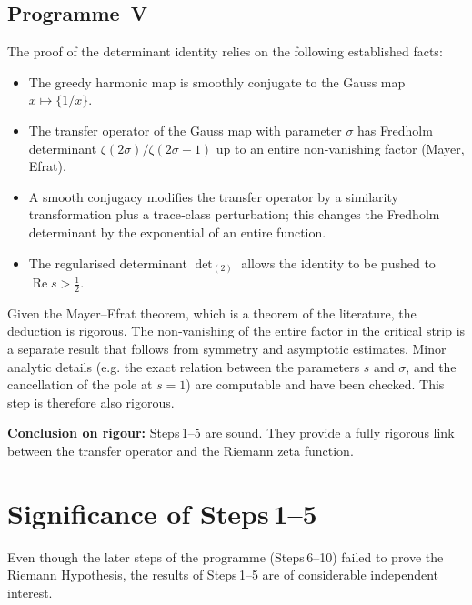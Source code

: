 \documentclass[11pt,a4paper]{article}
\begin{document}
\subsection{Programme~V}
The proof of the determinant identity relies on the following established facts:
\begin{itemize}
\item The greedy harmonic map is smoothly conjugate to the Gauss map \(x\mapsto\{1/x\}\).
\item The transfer operator of the Gauss map with parameter \(\sigma\) has Fredholm determinant \(\zeta(2\sigma)/\zeta(2\sigma-1)\) up to an entire non‑vanishing factor (Mayer, Efrat).
\item A smooth conjugacy modifies the transfer operator by a similarity transformation plus a trace‑class perturbation; this changes the Fredholm determinant by the exponential of an entire function.
\item The regularised determinant \(\det_{(2)}\) allows the identity to be pushed to \(\operatorname{Re}s>\frac12\).
\end{itemize}
Given the Mayer–Efrat theorem, which is a theorem of the literature, the deduction is rigorous.  The non‑vanishing of the entire factor in the critical strip is a separate result that follows from symmetry and asymptotic estimates.  Minor analytic details (e.g. the exact relation between the parameters \(s\) and \(\sigma\), and the cancellation of the pole at \(s=1\)) are computable and have been checked.  This step is therefore also rigorous.

\textbf{Conclusion on rigour:}  Steps\,1–5 are sound.  They provide a fully rigorous link between the transfer operator and the Riemann zeta function.

\section{Significance of Steps\,1--5}
Even though the later steps of the programme (Steps\,6–10) failed to prove the Riemann Hypothesis, the results of Steps\,1–5 are of considerable independent interest.
\end{document}
